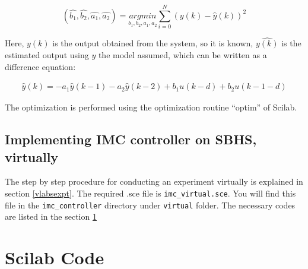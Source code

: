\[
(\hat{b_1}, \hat{b_2}, \hat{a_1}, \hat{a_2})=\underset{b_1, b_2, a_1, a_2}{argmin}\sum_{i=0}^{N}(y(k)-\hat{y}(k))^{2}
\]

Here, $y(k)$ is the output obtained from the system, so it is known, $\hat{y(k)}$ is the estimated output using $y$ the model assumed, which can be written as a difference equation:

\begin{align}
\hat{y}(k) = -a_1\hat{y}(k - 1) - a_2\hat{y}(k - 2) + b_1 u(k - d) + b_2 u(k - 1 - d)
\end{align}

The optimization is performed using the optimization routine “optim” of Scilab.




\subsection{Implementing IMC controller on SBHS, virtually}
The step by step procedure for conducting an experiment virtually is explained in section \ref{vlabsexpt}. The required .sce file is {\tt imc\_virtual.sce}.  You will find this file in the {\tt imc\_controller} directory under {\tt virtual} folder. The necessary codes are listed in the section \ref{imccodes}


\section{Scilab Code}\label{imccodes}
\begin{code}

\end{code}

\begin{code}

\end{code}


\begin{code}

\end{code}


\begin{code}

\end{code}


% 
